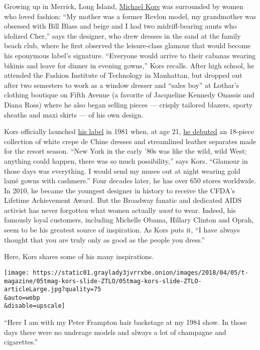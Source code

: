 Growing up in Merrick, Long Island,
\href{https://www.nytimes3xbfgragh.onion/topic/person/michael-kors}{Michael
Kors} was surrounded by women who loved fashion: ``My mother was a
former Revlon model, my grandmother was obsessed with Bill Blass and
beige and I had two midriff-bearing aunts who idolized Cher,'' says the
designer, who drew dresses in the sand at the family beach club, where
he first observed the leisure-class glamour that would become his
eponymous label's signature. ``Everyone would arrive to their cabanas
wearing bikinis and leave for dinner in evening gowns,'' Kors recalls.
After high school, he attended the Fashion Institute of Technology in
Manhattan, but dropped out after two semesters to work as a window
dresser and ``sales boy'' at Lothar's clothing boutique on Fifth Avenue
(a favorite of Jacqueline Kennedy Onassis and Diana Ross) where he also
began selling pieces --- crisply tailored blazers, sporty sheaths and
maxi skirts --- of his own design.

Kors officially launched \href{https://www.michaelkors.com/}{his label}
in 1981 when, at age 21,
\href{https://www.nytimes3xbfgragh.onion/1981/07/28/style/notes-on-fashion.html}{he
debuted} an 18-piece collection of white crepe de Chine dresses and
streamlined leather separates made for the resort season. ``New York in
the early '80s was like the wild, wild West; anything could happen,
there was so much possibility,'' says Kors. ``Glamour in those days was
everything. I would send my muses out at night wearing gold lamé gowns
with cashmere.'' Four decades later, he has over 650 stores worldwide.
In 2010, he became the youngest designer in history to receive the
CFDA's Lifetime Achievement Award. But the Broadway fanatic and
dedicated AIDS activist has never forgotten what women actually
\emph{want} to wear. Indeed, his famously loyal customers, including
Michelle Obama, Hillary Clinton and Oprah, seem to be his greatest
source of inspiration. As Kors puts it, ``I have always thought that you
are truly only as good as the people you dress.''

Here, Kors shares some of his many inspirations.

\texttt{[image: https://static01.graylady3jvrrxbe.onion/images/2018/04/05/t-magazine/05tmag-kors-slide-ZTLO/05tmag-kors-slide-ZTLO-articleLarge.jpg?quality=75\\\&auto=webp\\\&disable=upscale]}

``Here I am with my Peter Frampton hair backstage at my 1984 show. In
those days there were no underage models and always a lot of champagne
and cigarettes.''


